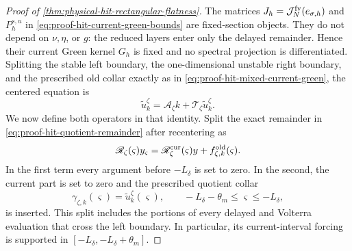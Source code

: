 \begin{proof}[Proof of
\cref{thm:physical-hit-rectangular-flatness}]
The matrices $J_h=\mathcal J_N^{\rm fv}(e_{\sigma,h})$ and
$P_h^{s,u}$ in \cref{eq:proof-hit-current-green-bounds} are fixed-section
objects.  They do not depend on $\nu,\eta$, or $g$: the reduced layers
enter only the delayed remainder.  Hence their current Green kernel
$G_h$ is fixed and no spectral projection is differentiated.  Splitting
the stable left boundary, the one-dimensional unstable right boundary,
and the prescribed old collar exactly as in
\cref{eq:proof-hit-mixed-current-green}, the centered equation is
\begin{equation}
 \widetilde u_k^\zeta
 =\mathcal A_\zeta k
       +\mathcal T_\zeta\widetilde u_k^\zeta.    \label{eq:proof-differentiated-hit-LP}
\end{equation}
We now define both operators in that identity.  Split the exact remainder
in \cref{eq:proof-hit-quotient-remainder} after recentering as
\begin{equation}
 \mathscr R_\zeta(\varsigma)y_\varsigma
 =\mathscr R_\zeta^{\rm cur}(\varsigma)y
       +f_{\zeta,k}^{\rm old}(\varsigma).         \label{eq:proof-centered-remainder-split}
\end{equation}
In the first term every argument before $-L_\delta$ is set to zero.  In the
second, the current part is set to zero and the prescribed quotient collar
\begin{equation}
 \gamma_{\zeta,k}(\varsigma)
 =\widetilde u_k^\zeta(\varsigma),
 \qquad -L_\delta-\theta_m\le\varsigma\le-L_\delta,
                                                               \label{eq:proof-centered-old-collar}
\end{equation}
is inserted.  This split includes the portions of every delayed and
Volterra evaluation that cross the left boundary.  In particular, its
current-interval forcing is supported in
$[-L_\delta,-L_\delta+\theta_m]$.


\end{proof}
